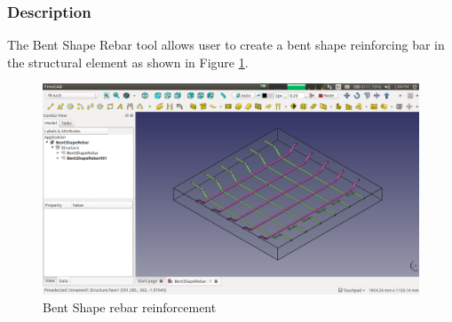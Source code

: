 \subsubsection{Description}
The Bent Shape Rebar tool allows user to create a bent shape reinforcing bar in the structural element as shown in Figure \ref{bentshaperebar}.
\begin{figure}
    \centering \includegraphics[scale=0.35]{images/BentShapeRebar.png}
    \caption{Bent Shape rebar reinforcement}
    \label{bentshaperebar}
\end{figure}
